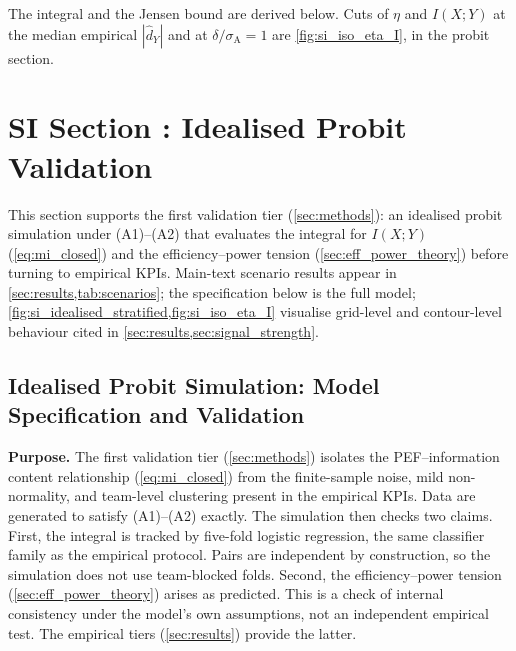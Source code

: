 \noindent The integral and the Jensen bound are derived below. Cuts of $\eta$ and $I(X;Y)$ at the median empirical $|\hat d_Y|$ and at $\delta/\sigma_{\mathrm{A}}=1$ are \cref{fig:si_iso_eta_I}, in the probit section.

\clearpage

\section*{SI Section \thesisection: Idealised Probit Validation}
\label{sec:si_probit}

\noindent This section supports the first validation tier (\cref{sec:methods}): an idealised probit simulation under (A1)--(A2) that evaluates the integral for $I(X;Y)$ (\cref{eq:mi_closed}) and the efficiency--power tension (\cref{sec:eff_power_theory}) before turning to empirical KPIs. Main-text scenario results appear in \cref{sec:results,tab:scenarios}; the specification below is the full model; \cref{fig:si_idealised_stratified,fig:si_iso_eta_I} visualise grid-level and contour-level behaviour cited in \cref{sec:results,sec:signal_strength}.

\subsection*{Idealised Probit Simulation: Model Specification and Validation}
\label{sec:si_note_s2}

\textbf{Purpose.} The first validation tier (\cref{sec:methods}) isolates the PEF--information content relationship (\cref{eq:mi_closed}) from the finite-sample noise, mild non-normality, and team-level clustering present in the empirical KPIs. Data are generated to satisfy (A1)--(A2) exactly. The simulation then checks two claims. First, the integral is tracked by five-fold logistic regression, the same classifier family as the empirical protocol. Pairs are independent by construction, so the simulation does not use team-blocked folds. Second, the efficiency--power tension (\cref{sec:eff_power_theory}) arises as predicted. This is a check of internal consistency under the model's own assumptions, not an independent empirical test. The empirical tiers (\cref{sec:results}) provide the latter.

